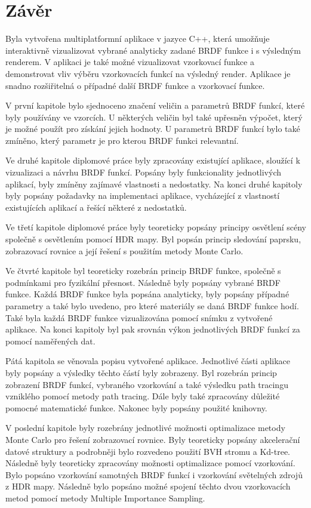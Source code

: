 \documentclass[czech,master]{diploma}
\begin{document}
\chapter{Závěr}
Byla vytvořena multiplatformní aplikace v jazyce C++, která umožňuje interaktivně vizualizovat vybrané analyticky zadané BRDF funkce i s výsledným renderem. V aplikaci je také možné vizualizovat vzorkovací funkce a demonstrovat vliv výběru vzorkovacích funkcí na výsledný render. Aplikace je snadno rozšiřitelná o případné další BRDF funkce a vzorkovací funkce.\par
V první kapitole bylo sjednoceno značení veličin a parametrů BRDF funkcí, které byly používány ve vzorcích. U některých veličin byl také upřesněn výpočet, který je možné použít pro získání jejich hodnoty. U parametrů BRDF funkcí bylo také zmíněno, který parametr je pro kterou BRDF funkci relevantní. \par
Ve druhé kapitole diplomové práce byly zpracovány existující aplikace, sloužící k vizualizaci a návrhu BRDF funkcí. Popsány byly funkcionality jednotlivých aplikací, byly zmíněny zajímavé vlastnosti a nedostatky. Na konci druhé kapitoly byly popsány požadavky na implementaci aplikace, vycházející z vlastností existujících aplikací a řešící některé z nedostatků.\par
Ve třetí kapitole diplomové práce byly teoreticky popsány principy osvětlení scény společně s osvětlením pomocí HDR mapy. Byl popsán princip sledování paprsku, zobrazovací rovnice a její řešení s použitím metody Monte Carlo.\par
Ve čtvrté kapitole byl teoreticky rozebrán princip BRDF funkce, společně s podmínkami pro fyzikální přesnost. Následně byly popsány vybrané BRDF funkce. Každá BRDF funkce byla popsána analyticky, byly popsány případné parametry a také bylo uvedeno, pro které materiály se daná BRDF funkce hodí. Také byla každá BRDF funkce vizualizována pomocí snímku z vytvořené aplikace. Na konci kapitoly byl pak srovnán výkon jednotlivých BRDF funkcí za pomocí naměřených dat.\par
Pátá kapitola se věnovala popisu vytvořené aplikace. Jednotlivé části aplikace byly popsány a výsledky těchto částí byly zobrazeny. Byl rozebrán princip zobrazení BRDF funkcí, vybraného vzorkování a také výsledku path tracingu vzniklého pomocí metody path tracing. Dále byly také zpracovány důležité pomocné matematické funkce. Nakonec byly popsány použité knihovny.\par
V poslední kapitole byly rozebrány jednotlivé možnosti optimalizace metody Monte Carlo pro řešení zobrazovací rovnice. Byly teoreticky popsány akcelerační datové struktury a podrobněji bylo rozvedeno použití BVH stromu a Kd-tree. Následně byly teoreticky zpracovány možnosti optimalizace pomocí vzorkování. Bylo popsáno vzorkování samotných BRDF funkcí i vzorkování světelných zdrojů z HDR mapy. Následně bylo popsáno možné spojení těchto dvou vzorkovacích metod pomocí metody Multiple Importance Sampling.\par
\end{document}
